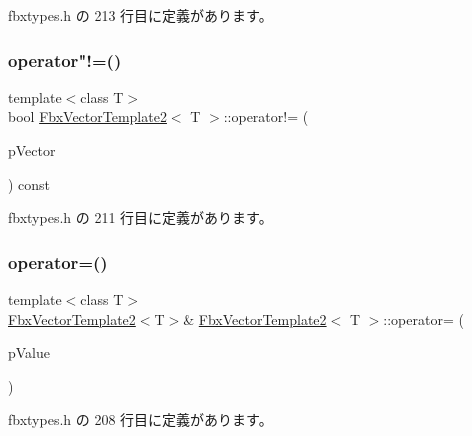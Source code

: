  fbxtypes.\+h の 213 行目に定義があります。

\mbox{\label{class_fbx_vector_template2_a892290b45c2afa593e89c8c8ee7ab51d}} 
\subsubsection{\texorpdfstring{operator"!=()}{operator!=()}}
{\footnotesize\ttfamily template$<$class T$>$ \\
bool \hyperlink{class_fbx_vector_template2}{Fbx\+Vector\+Template2}$<$ T $>$\+::operator!= (\begin{DoxyParamCaption}\item[{const \hyperlink{class_fbx_vector_template2}{Fbx\+Vector\+Template2}$<$ T $>$ \&}]{p\+Vector }\end{DoxyParamCaption}) const\hspace{0.3cm}{\ttfamily [inline]}}



 fbxtypes.\+h の 211 行目に定義があります。

\mbox{\label{class_fbx_vector_template2_ad30461b620c236ca3914e078aa3a74a9}} 
\subsubsection{\texorpdfstring{operator=()}{operator=()}\hspace{0.1cm}{\footnotesize\ttfamily [1/2]}}
{\footnotesize\ttfamily template$<$class T$>$ \\
\hyperlink{class_fbx_vector_template2}{Fbx\+Vector\+Template2}$<$T$>$\& \hyperlink{class_fbx_vector_template2}{Fbx\+Vector\+Template2}$<$ T $>$\+::operator= (\begin{DoxyParamCaption}\item[{const T \&}]{p\+Value }\end{DoxyParamCaption})\hspace{0.3cm}{\ttfamily [inline]}}



 fbxtypes.\+h の 208 行目に定義があります。

